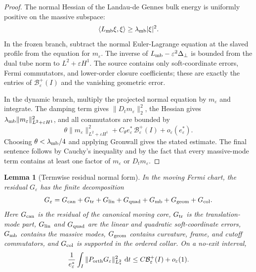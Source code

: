 \documentclass[11pt]{article}
\newtheorem{lemma}[theorem]{Lemma}
\theoremstyle{definition}
\newcommand{\dd}{\,\mathrm d}
\newcommand{\eps}{\varepsilon}
\newcommand{\estar}{e_\varepsilon^\ast}
\newcommand{\Basin}{\mathcal B}
\begin{document}
\begin{proof}
The normal Hessian of the Landau-de Gennes bulk energy is uniformly positive
on the massive subspace:
\[
        \langle L_{\rm mb}\xi,\xi\rangle
        \ge
        \lambda_{\rm mb}|\xi|^2 .
\]
In the frozen branch, subtract the normal Euler-Lagrange equation at the
slaved profile from the equation for \(m_\eps\).  The inverse of
\(L_{\rm mb}-\eps^2\Delta_\perp\) is bounded from the dual tube norm to
\(L^2+\eps H^1\).  The source contains only soft-coordinate errors, Fermi
commutators, and lower-order closure coefficients; these are exactly the
entries of \(\Basin_\eps^+(I)\) and the vanishing geometric error.

In the dynamic branch, multiply the projected normal equation by \(m_\eps\) and
integrate.  The damping term gives \(\|D_t m_\eps\|_2^2\), the Hessian gives
\(\lambda_{\rm mb}\|m_\eps\|_{L^2+\eps H^1}^2\), and all commutators are bounded
by
\[
        \theta\|m_\eps\|_{L^2+\eps H^1}^2
        +
        C_\theta \estar\,\Basin_\eps^+(I)
        +
        o_\eps(\estar).
\]
Choosing \(\theta<\lambda_{\rm mb}/4\) and applying Gronwall gives the stated
estimate.  The final sentence follows by Cauchy's inequality and by the fact
that every massive-mode term contains at least one factor of \(m_\eps\) or
\(D_t m_\eps\).
\end{proof}

\begin{lemma}[Termwise residual normal form]
\label{lem:short-residual-normal-form}
In the moving Fermi chart, the residual \(G_\eps\) has the finite decomposition
\[
        G_\eps
        =
        G_{\rm can}
        +
        G_{\rm tr}
        +
        G_{\rm lin}
        +
        G_{\rm quad}
        +
        G_{\rm mb}
        +
        G_{\rm geom}
        +
        G_{\rm col}.
\]
Here \(G_{\rm can}\) is the residual of the canonical moving core,
\(G_{\rm tr}\) is the translation-mode part, \(G_{\rm lin}\) and
\(G_{\rm quad}\) are the linear and quadratic soft-coordinate errors,
\(G_{\rm mb}\) contains the massive modes, \(G_{\rm geom}\) contains curvature,
frame, and cutoff commutators, and \(G_{\rm col}\) is supported in the ordered
collar.  On a no-exit interval,
\[
        \frac{1}{\estar}
        \int_I
        \|P_{\rm orth}G_\eps\|_{L_\ast^2}^2\,\dd t
        \le
        C\Basin_\eps^+(I)
        +
        o_\eps(1).
\]
\end{lemma}
\end{document}
